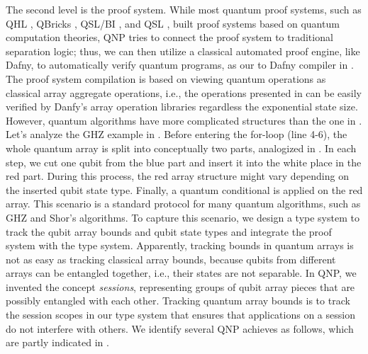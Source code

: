 The second level is the proof system. While most quantum proof systems, such as QHL \cite{qhoreusage}, QBricks \cite{qbricks},  QSL/BI \cite{qsepa}, and QSL \cite{quantumseparation}, built proof systems based on quantum computation theories, QNP tries to connect the \qafny proof system to traditional separation logic; thus, we can then utilize a classical automated proof engine, like Dafny, to automatically verify quantum programs, as our \qafny to Dafny compiler in .
The proof system compilation is based on viewing \qafny quantum operations as classical array aggregate operations, i.e., the operations presented in  can be easily verified by Danfy's array operation libraries regardless the exponential state size.
However, quantum algorithms have more complicated structures than the one in .
Let's analyze the GHZ example in . Before entering the for-loop (line 4-6), the whole quantum array is split into conceptually two parts, analogized in . In each step, we cut one qubit from the blue part and insert it into the white place in the red part.
During this process, the red array structure might vary depending on the inserted qubit state type.
Finally, a quantum conditional is applied on the red array.
This scenario is a standard protocol for many quantum algorithms, such as GHZ \cite{Greenberger1989} and Shor's algorithms. 
To capture this scenario, we design a type system to track the qubit array bounds and qubit state types and integrate the proof system with the type system. 
Apparently, tracking bounds in quantum arrays is not as easy as tracking classical array bounds, because qubits from different arrays can be entangled together, i.e., their states are not separable. In QNP, we invented the concept \emph{sessions}, representing groups of qubit array pieces that are possibly entangled with each other. Tracking quantum array bounds is to track the session scopes in our type system that ensures that applications on a session do not interfere with others. 
We identify several QNP achieves as follows, which are partly indicated in .

